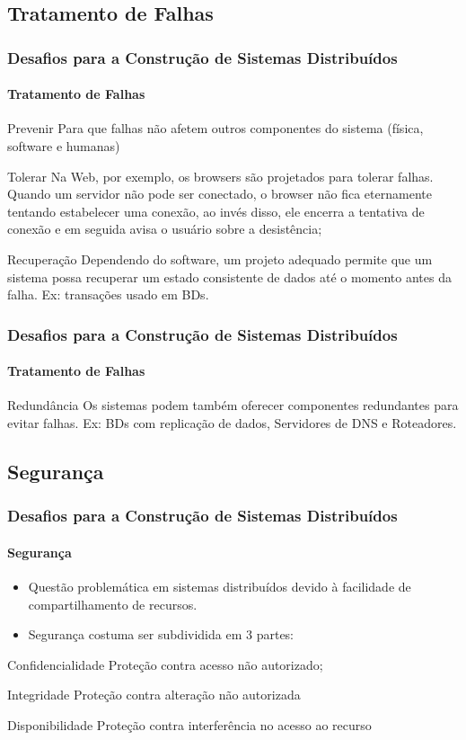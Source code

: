 \documentclass[hyperref={pdfpagelabels=false},table]{beamer}
\begin{document}
\subsection{Tratamento de Falhas}
\begin{frame}
    \frametitle{Desafios para a Construção de Sistemas Distribuídos}
    \framesubtitle{Tratamento de Falhas}
	\begin{block}{Prevenir}
	     Para que falhas não afetem outros componentes do sistema (física, software e humanas)
	\end{block}
	\begin{block}{Tolerar}
	    Na Web, por exemplo, os browsers são projetados para tolerar falhas. Quando um servidor não pode ser conectado, o browser não fica eternamente tentando estabelecer uma conexão, ao invés disso, ele encerra a tentativa de conexão e em seguida avisa o usuário sobre a desistência;
	\end{block}
	\begin{block}{Recuperação}
	     Dependendo do software, um projeto adequado permite que um sistema possa recuperar um estado consistente de dados até o momento antes da falha. Ex: transações usado em BDs.
	\end{block}
\end{frame}

\begin{frame}
    \frametitle{Desafios para a Construção de Sistemas Distribuídos}
    \framesubtitle{Tratamento de Falhas}
	\begin{block}{Redundância}
	    Os sistemas podem também oferecer componentes redundantes para evitar falhas. Ex: BDs com replicação de dados, Servidores de DNS e Roteadores.
	\end{block}
\end{frame}

\subsection{Segurança}
\begin{frame}
    \frametitle{Desafios para a Construção de Sistemas Distribuídos}
    \framesubtitle{Segurança}	
	\begin{itemize}
	   \item Questão problemática em sistemas distribuídos devido à facilidade de compartilhamento de recursos.
	   \item Segurança costuma ser subdividida em 3 partes:
	\end{itemize}
	\begin{block}{Confidencialidade}
          Proteção contra acesso não autorizado;
	\end{block}
	\begin{block}{Integridade}
         Proteção contra alteração não autorizada
	\end{block}
	\begin{block}{Disponibilidade}
         Proteção contra interferência no acesso ao recurso
	\end{block}
\end{frame}
\end{document}
